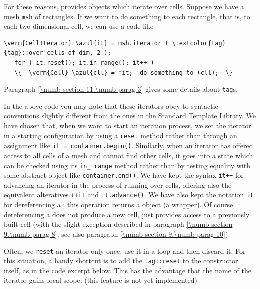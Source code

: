 For these reasons, {\maniFEM} provides objects which iterate over cells.
Suppose we have a mesh {\small\tt msh} of rectangles.
If we want to do something to each rectangle, that is, to each two-dimensional cell,
we can use a code like

\begin{Verbatim}[commandchars=\\\{\},formatcom=\small\tt,
   baselinestretch=0.94,framesep=2mm                      ]
   \verm{CellIterator} \azul{it} = msh.iterator ( \textcolor{tag}{tag}::over_cells_of_dim, 2 );
   for ( it.reset(); it.in_range(); it++ )
   \{  \verm{Cell} \azul{cll} = *it;  do_something_to (cll);  \}
\end{Verbatim}

Paragraph \ref{\numb section 11.\numb parag 3} gives some details about {\small\tt\textcolor{tag}{tag}}s.

In the above code you may note that these iterators obey to syntactic conventions
slightly different from the ones in the Standard Template Library.
We have chosen that, when we want to start an iteration process, we set the iterator in
a starting configuration by using a {\small\tt reset} method rather than through an assignment
like {\small\tt it = container.begin()}.
Similarly, when an iterator has offered access to all cells of a mesh and cannot find
other cells, it goes into a state which can be checked using its {\small\tt in\_\,range} method
rather than by testing equality with some abstract object like {\small\tt container.end()}.
We have kept the syntax {\small\tt it++} for advancing an iterator in the process of
running over cells, offering also the equivalent alteratives {\small\tt ++it} and
{\small\tt it.advance()}.
We have also kept the notation {\small\tt *it} for dereferencing a
{\small\tt {}};
this operation returns a {\small\tt {}} object (a wrapper).
Of course, dereferencing a {\small\tt {}} does not produce a new cell,
just provides access to a previously built cell
(with the slight exception described in paragraph \ref{\numb section 9.\numb parag 8};
see also paragraph \ref{\numb section 9.\numb parag 10}).

Often, we {\small\tt reset} an iterator only once, use it in a loop and then discard it.
For this situation, a handy shortcut is to add the {\small\tt\textcolor{tag}{tag}::reset}
to the constructor itself, as in the code excerpt below.
This has the advantage that the name of the iterator gains local scope.
(this feature is not yet implemented)

